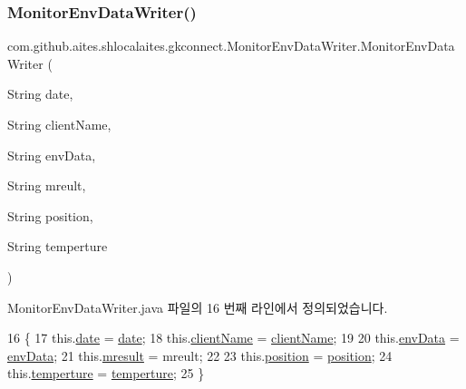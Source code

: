 \subsubsection{\texorpdfstring{Monitor\+Env\+Data\+Writer()}{MonitorEnvDataWriter()}}
{\footnotesize\ttfamily com.\+github.\+aites.\+shlocalaites.\+gkconnect.\+Monitor\+Env\+Data\+Writer.\+Monitor\+Env\+Data\+Writer (\begin{DoxyParamCaption}\item[{String}]{date,  }\item[{String}]{client\+Name,  }\item[{String}]{env\+Data,  }\item[{String}]{mreult,  }\item[{String}]{position,  }\item[{String}]{temperture }\end{DoxyParamCaption})}



Monitor\+Env\+Data\+Writer.\+java 파일의 16 번째 라인에서 정의되었습니다.


\begin{DoxyCode}
16                                                                                                            
                           \{
17         this.\mbox{\hyperlink{classcom_1_1github_1_1aites_1_1shlocalaites_1_1gkconnect_1_1_monitor_env_data_writer_a04cac2bb3a2553675195bab75d11ecd4}{date}} = \mbox{\hyperlink{classcom_1_1github_1_1aites_1_1shlocalaites_1_1gkconnect_1_1_monitor_env_data_writer_a04cac2bb3a2553675195bab75d11ecd4}{date}};
18         this.\mbox{\hyperlink{classcom_1_1github_1_1aites_1_1shlocalaites_1_1gkconnect_1_1_monitor_env_data_writer_aace57a568b525d7bced3189c5ce11722}{clientName}} = \mbox{\hyperlink{classcom_1_1github_1_1aites_1_1shlocalaites_1_1gkconnect_1_1_monitor_env_data_writer_aace57a568b525d7bced3189c5ce11722}{clientName}};
19 
20         this.\mbox{\hyperlink{classcom_1_1github_1_1aites_1_1shlocalaites_1_1gkconnect_1_1_monitor_env_data_writer_a2f1b25081ef6c871c400583913e5a5a2}{envData}} = \mbox{\hyperlink{classcom_1_1github_1_1aites_1_1shlocalaites_1_1gkconnect_1_1_monitor_env_data_writer_a2f1b25081ef6c871c400583913e5a5a2}{envData}};
21         this.\mbox{\hyperlink{classcom_1_1github_1_1aites_1_1shlocalaites_1_1gkconnect_1_1_monitor_env_data_writer_a11c5cf2c8245d1768c10d733e6a9befa}{mresult}} = mreult; 
22         
23         this.\mbox{\hyperlink{classcom_1_1github_1_1aites_1_1shlocalaites_1_1gkconnect_1_1_monitor_env_data_writer_a087d637fddca614523c49e762de1e563}{position}} = \mbox{\hyperlink{classcom_1_1github_1_1aites_1_1shlocalaites_1_1gkconnect_1_1_monitor_env_data_writer_a087d637fddca614523c49e762de1e563}{position}};
24         this.\mbox{\hyperlink{classcom_1_1github_1_1aites_1_1shlocalaites_1_1gkconnect_1_1_monitor_env_data_writer_a4360d90fa0ab7d3d76b2f4fd383f17da}{temperture}} = \mbox{\hyperlink{classcom_1_1github_1_1aites_1_1shlocalaites_1_1gkconnect_1_1_monitor_env_data_writer_a4360d90fa0ab7d3d76b2f4fd383f17da}{temperture}};
25     \}
\end{DoxyCode}


